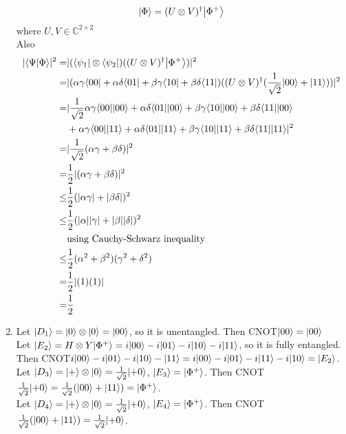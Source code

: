 \documentclass{assignment}
\newcommand{\inner}[2]{\ensuremath{\langle{#1}|{#2}\rangle}}
\begin{document}
\begin{problemlist}
\begin{answer}
\begin{enumerate}
      \begin{equation}
        {\left\vert{\Phi}\right\rangle} = (U\otimes V)^{\dagger}{\left\vert{\Phi^+}\right\rangle}
      \end{equation}
      where $U,V\in \mathbb{C}^{2\times 2}$\\
      Also
      \begin{align*}
        |\inner{\Psi}{\Phi}|^2 =& |(\bra{\psi_1} \otimes \bra{\psi_2})((U\otimes V)^{\dagger}\ket{\Phi^+})|^2\\
        =& |(\alpha \gamma \bra{00} + \alpha \delta \bra{01} + \beta \gamma \bra{10} + \beta \delta \bra{11})((U\otimes V)^{\dagger}(\frac{1}{\sqrt{2}}\ket{00}+\ket{11}))|^2\\
        =& |\frac{1}{\sqrt{2}}\alpha\gamma\bra{00}\ket{00} + \alpha\delta\bra{01}\ket{00} + \beta\gamma\bra{10}\ket{00} + \beta\delta\bra{11}\ket{00}\\
        &+\alpha\gamma\bra{00}\ket{11} + \alpha\delta\bra{01}\ket{11} + \beta\gamma\bra{10}\ket{11} + \beta\delta\bra{11}\ket{11}|^2\\
        =& |\frac{1}{\sqrt{2}} (\alpha\gamma + \beta\delta)|^2\\
        =& \frac{1}{2} |(\alpha\gamma + \beta\delta)|^2\\
        \le& \frac{1}{2} (|\alpha\gamma| + |\beta\delta|)^2\\
        \le& \frac{1}{2} (|\alpha||\gamma| + |\beta||\delta|)^2\\
        &\text{using Cauchy-Schwarz inequality}\\
        \le& \frac{1}{2} (\alpha^2 + \beta^2)(\gamma^2 + \delta^2)\\
        =& \frac{1}{2} |(1)(1)|\\
        =&\frac{1}{2}
      \end{align*}
    \item
      Let ${\left\vert{D_1}\right\rangle}={\left\vert{0}\right\rangle}\otimes {\left\vert{0}\right\rangle}={\left\vert{00}\right\rangle}$, so it is unentangled. Then CNOT${\left\vert{00}\right\rangle}={\left\vert{00}\right\rangle}$\\
      Let ${\left\vert{E_2}\right\rangle}=H\otimes Y{\left\vert{\Phi^+}\right\rangle}=i{\left\vert{00}\right\rangle}-i{\left\vert{01}\right\rangle}-i{\left\vert{10}\right\rangle}-i{\left\vert{11}\right\rangle}$, so it is fully entangled. Then CNOT$i{\left\vert{00}\right\rangle}-i{\left\vert{01}\right\rangle}-i{\left\vert{10}\right\rangle}-{\left\vert{11}\right\rangle}=i{\left\vert{00}\right\rangle}-i{\left\vert{01}\right\rangle}-i{\left\vert{11}\right\rangle}-i{\left\vert{10}\right\rangle}={\left\vert{E_2}\right\rangle}$.\\
      Let ${\left\vert{D_3}\right\rangle}={\left\vert{+}\right\rangle}\otimes{\left\vert{0}\right\rangle}=\frac{1}{\sqrt{2}}{\left\vert{+0}\right\rangle}$, ${\left\vert{E_3}\right\rangle}={\left\vert{\Phi^+}\right\rangle}$. Then CNOT$\frac{1}{\sqrt{2}}{\left\vert{+0}\right\rangle}=\frac{1}{\sqrt{2}}({\left\vert{00}\right\rangle}+{\left\vert{11}\right\rangle})={\left\vert{\Phi^+}\right\rangle}$.\\
      Let ${\left\vert{D_4}\right\rangle}={\left\vert{+}\right\rangle}\otimes{\left\vert{0}\right\rangle}=\frac{1}{\sqrt{2}}{\left\vert{+0}\right\rangle}$, ${\left\vert{E_4}\right\rangle}={\left\vert{\Phi^+}\right\rangle}$. Then CNOT$\frac{1}{\sqrt{2}}({\left\vert{00}\right\rangle}+{\left\vert{11}\right\rangle})=\frac{1}{\sqrt{2}}{\left\vert{+0}\right\rangle}$.\\
    \end{enumerate}
  \end{answer}


\end{problemlist}
\end{document}
